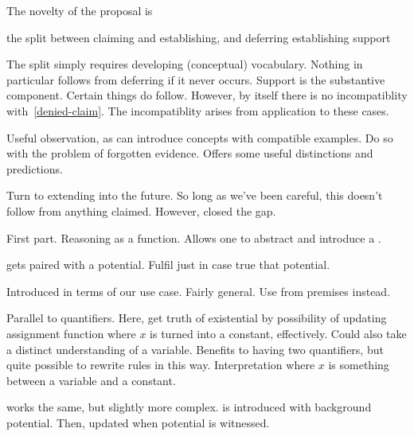 \begin{note}[Novelty]
  The novelty of the proposal is

  the split between claiming and establishing, and deferring establishing
  support

  The split simply requires developing (conceptual) vocabulary.
  Nothing in particular follows from deferring if it never occurs.
  Support is the substantive component.
  Certain things do follow.
  However, by itself there is no incompatiblity with~\ref{denied-claim}.
  The incompatiblity arises from application to these cases.

  Useful observation, as can introduce concepts with compatible examples.
  Do so with the problem of forgotten evidence.
  Offers some useful distinctions and predictions.

  Turn to extending into the future.
  So long as we've been careful, this doesn't follow from anything claimed.
  However, closed the gap.
\end{note}




\begin{note}
  First part.
  Reasoning as a function.
  Allows one to abstract and introduce a \future{}.

  \future{} gets paired with a potential.
  Fulfil \future{} just in case true that potential.

  Introduced in terms of our use case.
  Fairly general.
  Use from premises instead.

  Parallel to quantifiers.
  Here, get truth of existential by possibility of updating assignment function where \(x\) is turned into a constant, effectively.
  Could also take a distinct understanding of a variable.
  Benefits to having two quantifiers, but quite possible to rewrite rules in this way.
  Interpretation where \(x\) is something between a variable and a constant.

  \future{} works the same, but slightly more complex.
  \future{} is introduced with background potential.
  Then, updated when potential is witnessed.

\end{note}




\newpage


